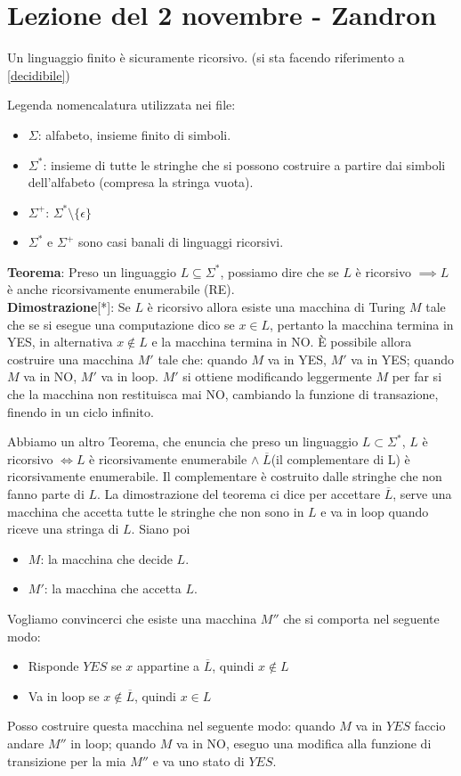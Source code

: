 \section{Lezione del 2 novembre - Zandron}
Un linguaggio finito è sicuramente ricorsivo. (si sta facendo riferimento a \ref{decidibile})

Legenda nomencalatura utilizzata nei file:
\begin{itemize}
    \item $\displaystyle \Sigma$: alfabeto, insieme finito di simboli.
    \item $\displaystyle \Sigma^*$: insieme di tutte le stringhe che si possono costruire a partire dai simboli dell’alfabeto (compresa la stringa vuota).
    \item $\displaystyle \Sigma^+$: $\Sigma^* \setminus \{\epsilon\}$
    \item $\displaystyle \Sigma^*$ e $\Sigma^+$ sono casi banali di linguaggi ricorsivi.
\end{itemize}

\textbf{Teorema}: Preso un linguaggio $L \subseteq \Sigma^*$, possiamo dire che se $L$ è ricorsivo $\implies L$ è anche ricorsivamente enumerabile (RE).\\
\textbf{Dimostrazione}[\label{dimostrazione_ricorsivamente_enumerabile}*]: Se $L$ è ricorsivo allora esiste una macchina di Turing $M$ tale che se si esegue una computazione dico se $x \in L$, pertanto la macchina termina in YES, in alternativa  $x \notin L$ e la macchina termina in NO.  È possibile allora costruire una macchina $M'$ tale che: quando $M$ va in YES, $M'$ va in YES; quando $M$ va in NO, $M'$ va in loop.
$M'$ si ottiene modificando leggermente $M$ per far si che la macchina non restituisca mai NO, cambiando la funzione di transazione, finendo in un ciclo infinito. 


Abbiamo un altro Teorema, che enuncia che preso un linguaggio $L \subset \Sigma^*$, $L$ è ricorsivo $\iff L$ è ricorsivamente enumerabile $\land \;  \overline{L}$(il complementare di L) è ricorsivamente enumerabile. Il complementare è costruito dalle stringhe che non fanno parte di $L$. La dimostrazione del teorema ci dice per accettare $\overline{L}$, serve una macchina che accetta tutte le stringhe che non sono in $L$ e va in loop quando riceve una stringa di $L$.
Siano poi \begin{itemize}
    \item $M$: la macchina che decide $L$.
    \item $M'$: la macchina che accetta $L$. 
\end{itemize}
Vogliamo convincerci che esiste una macchina $M''$ che si comporta nel seguente modo:
\begin{itemize}
    \item Risponde $YES$ se $x$ appartine a $\overline{L}$, quindi $x \notin L$
    \item Va in loop se $x \notin  \overline{L}$, quindi $x \in L$
\end{itemize}
Posso costruire questa macchina nel seguente modo: quando $M$ va in $YES$ faccio andare $M''$ in loop; quando $M$ va in NO, eseguo una modifica alla funzione di transizione per la mia $M''$ e va uno stato di $YES$.

